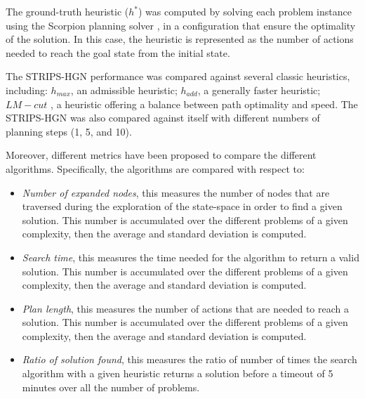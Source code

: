 The ground-truth heuristic ($h^{*}$) was computed by solving each problem instance using the Scorpion planning solver \cite{seipp2020saturated}, in a configuration that ensure the optimality of the solution. In this case, the heuristic is represented as the number of actions needed to reach the goal state from the initial state.

The STRIPS-HGN performance was compared against several classic heuristics, including:
$h_{max}$, an admissible heuristic; $h_{add}$, a generally faster heuristic; $LM-cut$ \cite{richter2010lama}, a heuristic offering a balance between path optimality and speed. The STRIPS-HGN was also compared against itself with different numbers of planning steps (1, 5, and 10).

Moreover, different metrics have been proposed to compare the different algorithms. Specifically, the algorithms are compared with respect to:
\begin{itemize}
    \item \textit{Number of expanded nodes}, this measures the number of nodes that are traversed during the exploration of the state-space in order to find a given solution. This number is accumulated over the different problems of a given complexity, then the average and standard deviation is computed.
    \item \textit{Search time}, this measures the time needed for the algorithm to return a valid solution.  This number is accumulated over the different problems of a given complexity, then the average and standard deviation is computed.
    \item \textit{Plan length}, this measures the number of actions that are needed to reach a solution. This number is accumulated over the different problems of a given complexity, then the average and standard deviation is computed.
    \item \textit{Ratio of solution found}, this measures the ratio of number of times the search algorithm with a given heuristic returns a solution before a timeout of 5 minutes over all the number of problems.
\end{itemize}

